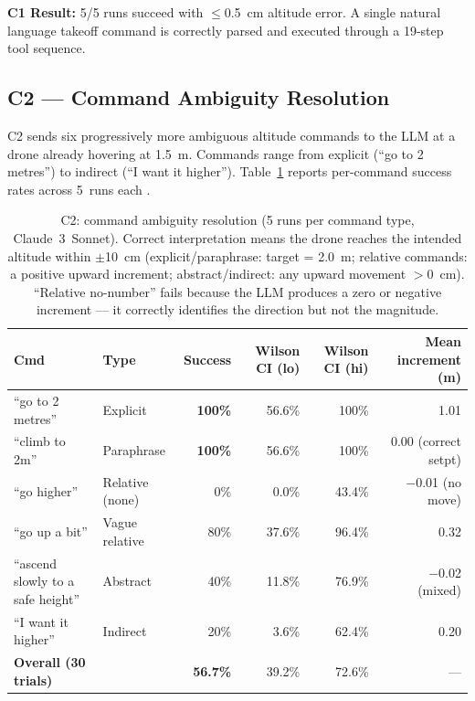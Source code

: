 \textbf{C1 Result:} 5/5 runs succeed with $\leq$0.5~cm altitude error.
A single natural language takeoff command is correctly parsed and executed
through a 19-step tool sequence.

\subsection{C2 --- Command Ambiguity Resolution}
\label{sec:ch3_c2}

C2 sends six progressively more ambiguous altitude commands to the LLM at a
drone already hovering at 1.5~m. Commands range from explicit (``go to 2
metres'') to indirect (``I want it higher''). Table~\ref{tab:ch3_c2} reports
per-command success rates across 5~runs each \cite{huang2022innermonologue}.

\begin{table}[ht]
  \caption{C2: command ambiguity resolution (5 runs per command type, Claude~3~Sonnet).
    Correct interpretation means the drone reaches the intended altitude within
    $\pm$10~cm (explicit/paraphrase: target = 2.0~m; relative commands:
    a positive upward increment; abstract/indirect: any upward movement $> 0$~cm).
    ``Relative no-number'' fails because the LLM produces a zero or negative
    increment --- it correctly identifies the direction but not the magnitude.}
  \label{tab:ch3_c2}
  \centering
  \small
  \begin{tabular}{llrrrr}
    \toprule
    Cmd & Type & Success & Wilson CI (lo) & Wilson CI (hi) & Mean increment (m) \\
    \midrule
    ``go to 2 metres''                  & Explicit        & \textbf{100\%} & 56.6\% & 100\% & 1.01 \\
    ``climb to 2m''                     & Paraphrase      & \textbf{100\%} & 56.6\% & 100\% & 0.00 (correct setpt) \\
    ``go higher''                       & Relative (none) & 0\%            & 0.0\%  & 43.4\% & $-$0.01 (no move) \\
    ``go up a bit''                     & Vague relative  & 80\%           & 37.6\% & 96.4\% & 0.32 \\
    ``ascend slowly to a safe height''  & Abstract        & 40\%           & 11.8\% & 76.9\% & $-$0.02 (mixed) \\
    ``I want it higher''                & Indirect        & 20\%           & 3.6\%  & 62.4\% & 0.20 \\
    \midrule
    \textbf{Overall (30 trials)}        &                 & \textbf{56.7\%} & 39.2\% & 72.6\% & --- \\
    \bottomrule
  \end{tabular}
\end{table}

